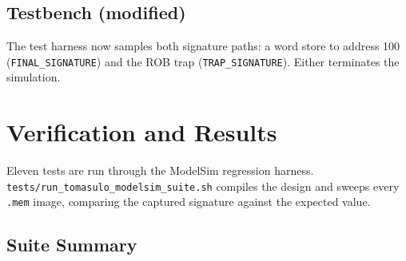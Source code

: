 \documentclass[11pt]{article}
\begin{document}
\subsection{Testbench (modified)}

The test harness now samples both signature paths: a word store to address 100
(\texttt{FINAL\_SIGNATURE}) and the ROB trap (\texttt{TRAP\_SIGNATURE}). Either
terminates the simulation.

\section{Verification and Results}

Eleven tests are run through the ModelSim regression harness.
\texttt{tests/run\_tomasulo\_modelsim\_suite.sh} compiles the design and sweeps
every \texttt{.mem} image, comparing the captured signature against the
expected value.

\subsection{Suite Summary}
\end{document}

